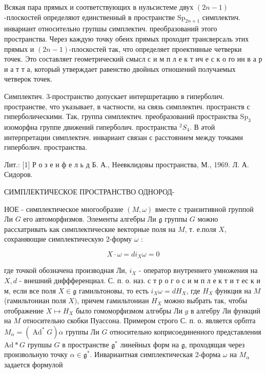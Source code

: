 \documentclass[10pt]{article}
\begin{document}
Всякая пара прямых и соответствующих в нульсистеме двух $(2 n-1)$-плоскостей определяют единственный в пространстве $\mathrm{Sp}_{2 n+1}$ симплектич. инвариант относительно групшы симплектич. преобразований этого пространства. Через каждую точку обеих прямых проходит трансверсаль этих прямых и $(2 n-1)$-плоскостей так, что определяет проективные четверки точек. Это составляет геометрический смысл с и м п л е к т ич е с к о го ин в а р и а т т а, который утверждает равенство двойных отношений получаемых четверок точек.



Симплектич. 3-пространство допускает интершретацию в гиперболич. пространстве, что указывает, в частности, на связь симплектич. пространств с гиперболическими. Так, группа симплектич. преобразований пространства $\mathrm{Sp}_{3}$ изоморфна группе движений гиперболич. пространства ${ }^{2} S_{4}$. В әтой интерпретации симплектич. инвариант связан с расстоянием между точками гиперболич. пространства.



Лит.: [1] Р о з е н ф е л ь д Б. А., Неевклидовы пространства, М., 1969. Л. А. Сидоров.



СИМПЛЕКТИЧЕСКОЕ ПРОСТРАНСТВО ОДНОРОД-



НОЕ - симплектическое многообразие $(M, \omega)$ вместе с транзитивной группой Ли $G$ его автоморфизмов. Элементы алгебры Ли $\mathfrak{g}$ группы $G$ можно рассхатривать как симплектические векторные поля на $M$, т. е.поля $X$, сохраняющие симплектическую 2-форму $\omega$ :



\[

X \cdot \omega=d i_{X} \omega=0

\]



где точкой обозначена производная Ли, $i_{X}$ - оператор внутреннего умножения на $X, d$ - внешний диффференциал. С. п. о. наз. с т р о г о с и м п л е к т и т ес к и м, если все поля $X \in \mathfrak{g}$ гамильтоновы, то есть $i_{X} \omega=d H_{X}$, где $H_{X}$ функция на $M$ (гамильтониан поля $X)$, причем гамильтониан $H_{X}$ можно выбрать так, чтобы отображение $X \mapsto H_{X}$ было гомоморфизмом алгөбры Ли $g$ в алгебру Ли функций на $M$ относительно скобки Пуассона. Примером строго С. п. о. является орбпта $M_{\alpha}=\left(\operatorname{Ad}^{*} G\right) \alpha$ группы Ли $G$ относительно коприсоединенного представления $\mathrm{Ad} * G$ групшы $G$ в пространстве $\mathfrak{g}^{*}$ линейных форм на $\mathfrak{g}$, проходящая через произвольную точку $\alpha \in \mathfrak{g}^{*}$. Инвариантная симплектическая 2-форма $\omega$ на $M_{\alpha}$ задается формулой
\end{document}
